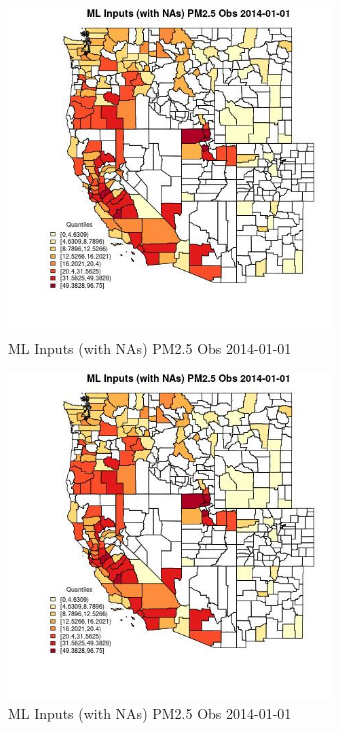 \begin{figure} 
\centering  
\includegraphics[width=0.77\textwidth]{Code_Outputs/Report_ML_input_PM25_Step4_part_e_de_duplicated_aveswNAs_CountyPM25_ObsMean2014-01-01_2014-01-01.jpg} 
\caption{\label{fig:Report_ML_input_PM25_Step4_part_e_de_duplicated_aveswNAsCountyPM25_ObsMean2014-01-01_2014-01-01}ML Inputs (with NAs) PM2.5 Obs 2014-01-01} 
\end{figure} 
 

\begin{figure} 
\centering  
\includegraphics[width=0.77\textwidth]{Code_Outputs/Report_ML_input_PM25_Step4_part_e_de_duplicated_aveswNAs_CountyPM25_ObsMean2014-01-01_2014-01-01.jpg} 
\caption{\label{fig:Report_ML_input_PM25_Step4_part_e_de_duplicated_aveswNAsCountyPM25_ObsMean2014-01-01_2014-01-01}ML Inputs (with NAs) PM2.5 Obs 2014-01-01} 
\end{figure} 
 

